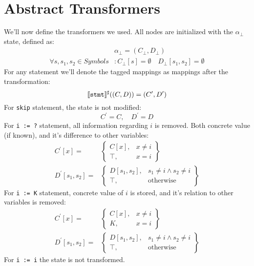 \section*{Abstract Transformers}

We'll now define the transformers we used. All nodes are initialized with the $\alpha_\bot$ state, defined as:
\begin{align*}
	&\alpha_\bot=(C_\bot, D_\bot) \\
	\forall s,s_1,s_2 \in Symbols&:
	C_\bot[s] =\emptyset \quad
	D_\bot[s_1,s_2] =\emptyset
\end{align*}
For any statement we'll denote the tagged mappings as mappings after the transformation:
\begin{equation*}
	[\![\texttt{stmt}]\!]^\sharp((C,D)) = (C^\prime,D^\prime)
\end{equation*}
For \texttt{skip} statement, the state is not modified:
\begin{equation*}
	C^\prime = C, \quad D^\prime = D
\end{equation*}
For \texttt{i := ?} statement, all information regarding $i$ is removed. Both concrete value (if known), and it's difference to other variables:
\begin{align*}
C^\prime[x] = & \left.
	\begin{cases}
		C[x], & x\ne i \\
		\top, & x = i
	\end{cases}
\right\}\\
D^\prime[s_1, s_2] = & \left.
	\begin{cases}
		D[s_1,s_2], & s_1 \ne i \wedge s_2 \ne i \\
		\top, & \text{otherwise}
	\end{cases}
\right\}
\end{align*}
For \texttt{i := K} statement, concrete value of $i$ is stored, and it's relation to other variables is removed:
\begin{align*}
C^\prime[x] = & \left.
	\begin{cases}
		C[x], & x\ne i \\
		K, & x = i 
	\end{cases}
\right\}\\
D^\prime[s_1, s_2] = & \left.
	\begin{cases}
		D[s_1,s_2], & s_1 \ne i \wedge s_2 \ne i \\
		\top, & \text{otherwise}
	\end{cases}
\right\}
\end{align*}
For \texttt{i := i} the state is not transformed.

